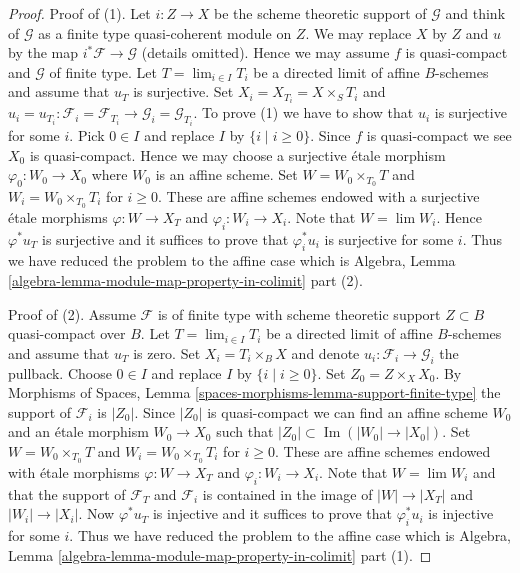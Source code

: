 \documentclass[10pt,a4paper]{amsart}
\theoremstyle{plain}
\theoremstyle{definition}
\theoremstyle{remark}
\numberwithin{equation}{subsection}
\def\lim{\mathop{\mathrm{lim}}\nolimits}
\def\Im{\mathop{\mathrm{Im}}}
\begin{document}
\begin{proof}
Proof of (1). Let $i : Z \to X$ be the scheme theoretic support of
$\mathcal{G}$ and think of $\mathcal{G}$ as a finite type quasi-coherent
module on $Z$. We may replace $X$ by $Z$ and $u$ by the map
$i^*\mathcal{F} \to \mathcal{G}$ (details omitted). Hence we may assume
$f$ is quasi-compact and $\mathcal{G}$ of finite type.
Let $T = \lim_{i \in I} T_i$ be a directed limit of affine $B$-schemes
and assume that $u_T$ is surjective.
Set $X_i = X_{T_i} = X \times_S T_i$ and
$u_i = u_{T_i} : \mathcal{F}_i = \mathcal{F}_{T_i}
\to \mathcal{G}_i = \mathcal{G}_{T_i}$.
To prove (1) we have to show that $u_i$ is surjective for some $i$.
Pick $0 \in I$ and replace $I$ by $\{i \mid i \geq 0\}$.
Since $f$ is quasi-compact we see $X_0$ is quasi-compact.
Hence we may choose a surjective \'etale morphism $\varphi_0 : W_0 \to X_0$
where $W_0$ is an affine scheme. Set $W = W_0 \times_{T_0} T$
and $W_i = W_0 \times_{T_0} T_i$ for $i \geq 0$.  These
are affine schemes endowed
with a surjective \'etale morphisms $\varphi : W \to X_T$ and
$\varphi_i : W_i \to X_i$. Note that $W = \lim W_i$.
Hence $\varphi^*u_T$ is surjective and it suffices to prove that
$\varphi_i^*u_i$ is surjective for some $i$. Thus we have reduced
the problem to the affine case which is
Algebra, Lemma \ref{algebra-lemma-module-map-property-in-colimit} part (2).

\medskip\noindent
Proof of (2). Assume $\mathcal{F}$ is of finite type with scheme theoretic
support $Z \subset B$ quasi-compact over $B$. Let $T = \lim_{i \in I} T_i$
be a directed limit of affine $B$-schemes and assume that $u_T$ is zero.
Set $X_i = T_i \times_B X$ and denote $u_i : \mathcal{F}_i \to \mathcal{G}_i$
the pullback. Choose $0 \in I$ and replace $I$ by
$\{i \mid i \geq 0\}$. Set $Z_0 = Z \times_X X_0$. By
Morphisms of Spaces, Lemma \ref{spaces-morphisms-lemma-support-finite-type}
the support of $\mathcal{F}_i$ is $|Z_0|$. Since $|Z_0|$ is quasi-compact
we can find an affine scheme $W_0$ and an \'etale morphism $W_0 \to X_0$
such that $|Z_0| \subset \Im(|W_0| \to |X_0|)$.
Set $W = W_0 \times_{T_0} T$ and $W_i = W_0 \times_{T_0} T_i$ for $i \geq 0$.
These are affine schemes endowed
with \'etale morphisms $\varphi : W \to X_T$ and
$\varphi_i : W_i \to X_i$. Note that $W = \lim W_i$
and that the support of $\mathcal{F}_T$ and $\mathcal{F}_i$
is contained in the image of $|W| \to |X_T|$ and $|W_i| \to |X_i|$.
Now $\varphi^*u_T$ is injective and it suffices to prove that
$\varphi_i^*u_i$ is injective for some $i$.
Thus we have reduced the problem to the affine case which is
Algebra, Lemma \ref{algebra-lemma-module-map-property-in-colimit} part (1).


\end{proof}
\end{document}
